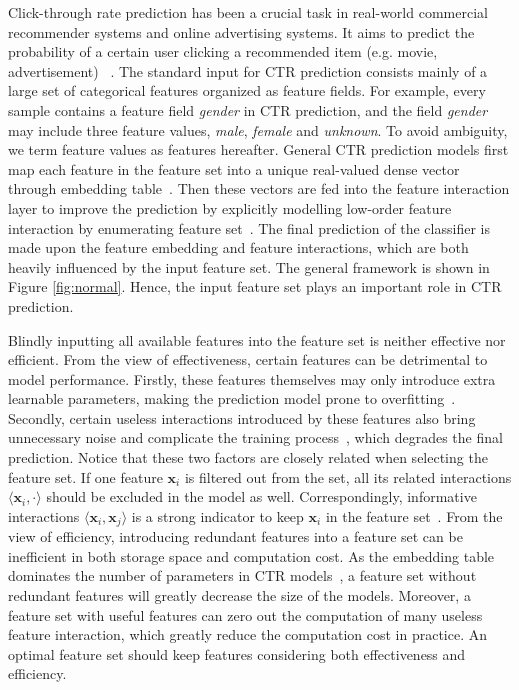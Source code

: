 \documentclass[sigconf]{acmart}
\begin{document}
Click-through rate prediction has been a crucial task in real-world commercial recommender systems and online advertising systems. It aims to predict the probability of a certain user clicking a recommended item (e.g. movie, advertisement) ~\cite{LR, ADS}. The standard input for CTR prediction consists mainly of a large set of categorical features organized as feature fields. For example, every sample contains a feature field \textit{gender} in CTR prediction, and the field \textit{gender} may include three feature values, \textit{male}, \textit{female} and \textit{unknown}. To avoid ambiguity, we term feature values as features hereafter. General CTR prediction models first map each feature in the feature set into a unique real-valued dense vector through embedding table~\cite{OptEmbed}. Then these vectors are fed into the feature interaction layer to improve the prediction by explicitly modelling low-order feature interaction by enumerating feature set~\cite{AutoPI}. The final prediction of the classifier is made upon the feature embedding and feature interactions, which are both heavily influenced by the input feature set. The general framework is shown in Figure \ref{fig:normal}. Hence, the input feature set plays an important role in CTR prediction.

Blindly inputting all available features into the feature set is neither effective nor efficient. From the view of effectiveness, certain features can be detrimental to model performance. Firstly, these features themselves may only introduce extra learnable parameters, making the prediction model prone to overfitting~\cite{RLReview, Elements_SL}. Secondly, certain useless interactions introduced by these features also bring unnecessary noise and complicate the training process~\cite{AutoFIS}, which degrades the final prediction. Notice that these two factors are closely related when selecting the feature set. If one feature $\mathbf{x}_i$ is filtered out from the set, all its related interactions $\langle \mathbf{x}_i, \cdot \rangle$ should be excluded in the model as well. Correspondingly, informative interactions $\langle \mathbf{x}_i, \mathbf{x}_j \rangle$ is a strong indicator to keep $\mathbf{x}_i$ in the feature set~\cite{AutoCross}. From the view of efficiency, introducing redundant features into a feature set can be inefficient in both storage space and computation cost. As the embedding table dominates the number of parameters in CTR models~\cite{sfctr}, a feature set without redundant features will greatly decrease the size of the models. Moreover, a feature set with useful features can zero out the computation of many useless feature interaction, which greatly reduce the computation cost in practice. An optimal feature set should keep features considering both effectiveness and efficiency.
\end{document}

